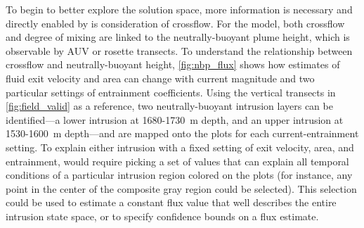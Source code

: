 To begin to better explore the solution space, more information is necessary and directly enabled by \PHUMES is consideration of crossflow. For the \PHUMES model, both crossflow and degree of mixing are linked to the neutrally-buoyant plume height, which is observable by AUV or rosette transects. To understand the relationship between crossflow and neutrally-buoyant height, \cref{fig:nbp_flux} shows how estimates of fluid exit velocity and area can change with current magnitude and two particular settings of entrainment coefficients. Using the vertical transects in \cref{fig:field_valid} as a reference, two neutrally-buoyant intrusion layers can be identified---a lower intrusion at 1680-\SI{1730}{\meter} depth, and an upper intrusion at 1530-\SI{1600}{\meter} depth---and are mapped onto the plots for each current-entrainment setting. To explain either intrusion with a fixed setting of exit velocity, area, and entrainment, would require picking a set of values that can explain all temporal conditions of a particular intrusion region colored on the plots (for instance, any point in the center of the composite gray region could be selected). This selection could be used to estimate a constant flux value that well describes the entire intrusion state space, or to specify confidence bounds on a flux estimate.

